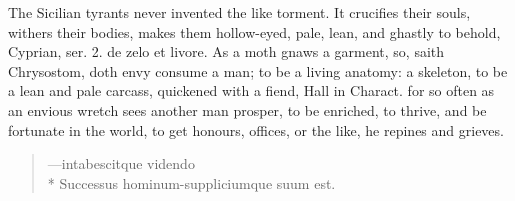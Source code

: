{The Sicilian tyrants never invented the like torment. It crucifies
their souls, withers their bodies, makes them hollow-eyed, pale,
lean, and ghastly to behold, Cyprian, ser. 2. de zelo et livore.
As a moth gnaws a garment, so, saith Chrysostom, doth envy
consume a man; to be a living anatomy: a skeleton, to be a lean and
pale carcass, quickened with a fiend, Hall in Charact. for
so often as an envious wretch sees another man prosper, to be enriched,
to thrive, and be fortunate in the world, to get honours, offices, or
the like, he repines and grieves.

\begin{verse}
---\textlatin{intabescitque videndo\\*
  Successus hominum-suppliciumque suum est.}
\end{verse}

}

